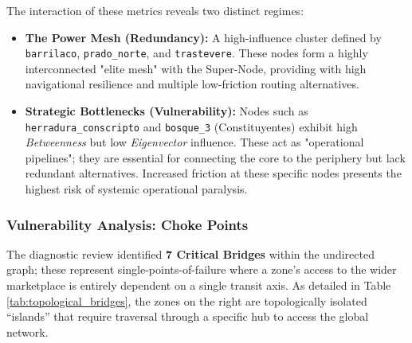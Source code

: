 The interaction of these metrics reveals two distinct regimes:

\begin{itemize}[noitemsep, topsep=3pt]
    \item \textbf{The Power Mesh (Redundancy):} A high-influence cluster defined by \texttt{barrilaco}, \texttt{prado\_norte}, and \texttt{trastevere}. These nodes form a highly interconnected "elite mesh" with the Super-Node, providing with high navigational resilience and multiple low-friction routing alternatives.
    
    \item \textbf{Strategic Bottlenecks (Vulnerability):} Nodes such as \texttt{herradura\_conscripto} and \texttt{bosque\_3} (Constituyentes) exhibit high \textit{Betweenness} but low \textit{Eigenvector} influence. These act as "operational pipelines"; they are essential for connecting the core to the periphery but lack redundant alternatives. Increased friction at these specific nodes presents the highest risk of systemic operational paralysis.
\end{itemize}


\subsubsection{Vulnerability Analysis: Choke Points}
The diagnostic review identified \textbf{7 Critical Bridges} within the undirected graph; these represent single-points-of-failure where a zone’s access to the wider marketplace is entirely dependent on a single transit axis. As detailed in Table \ref{tab:topological_bridges}, the zones on the right are topologically isolated ``islands'' that require traversal through a specific hub to access the global network.


